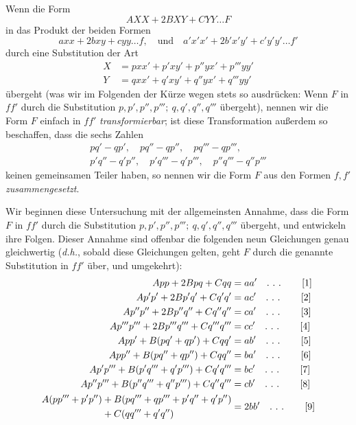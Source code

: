 Wenn die Form
\[
AXX+2BXY+CYY\ldots F
\]
in das Produkt der beiden Formen
\[
axx+2bxy+cyy\ldots f,\quad\text{und}\quad a'x'x'+2b'x'y'+c'y'y'\ldots f'
\]
durch eine Substitution der Art
\[
\begin{aligned}
X&=pxx'+p'xy'+p''yx'+p'''yy'\\
Y&=qxx'+q'xy'+q''yx'+q'''yy'
\end{aligned}
\]
übergeht (was wir im Folgenden der Kürze wegen stets so ausdrücken: Wenn $F$ in $ff'$ durch die Substitution $p,p',p'',p''';\ q,q',q'',q'''$ übergeht), nennen wir die Form $F$ einfach in $ff'$ \textit{transformierbar}; ist diese Transformation außerdem so beschaffen, dass die sechs Zahlen
\[
\begin{gathered}pq'-qp',\quad pq''-qp'',\quad pq'''-qp''',\\p'q''-q'p'',\quad p'q'''-q'p''',\quad p''q'''-q''p'''\end{gathered}
\]
keinen gemeinsamen Teiler haben, so nennen wir die Form $F$ aus den Formen $f,f'$ \textit{zusammengesetzt}.

Wir beginnen diese Untersuchung mit der allgemeinsten Annahme, dass die Form $F$ in $ff'$ durch die Substitution $p,p',p'',p''';\ q,q',q'',q'''$ übergeht, und entwickeln ihre Folgen. Dieser Annahme sind offenbar die folgenden neun Gleichungen genau gleichwertig (\textit{d.h.}, sobald diese Gleichungen gelten, geht $F$ durch die genannte Substitution in $ff'$ über, und umgekehrt):
\begin{align*}
App+2Bpq+Cqq&=aa'\quad\ldotp\,\ldotp\,\ldotp\tag*{[1]}\\
Ap'p'+2Bp'q'+Cq'q'&=ac'\quad\ldotp\,\ldotp\,\ldotp\tag*{[2]}\\
Ap''p''+2Bp''q''+Cq''q''&=ca'\quad\ldotp\,\ldotp\,\ldotp\tag*{[3]}\\
Ap'''p'''+2Bp'''q'''+Cq'''q'''&=cc'\quad\ldotp\,\ldotp\,\ldotp\tag*{[4]}\\
App'+B(pq'+qp')+Cqq'&=ab'\quad\ldotp\,\ldotp\,\ldotp\tag*{[5]}\\
App''+B(pq''+qp'')+Cqq''&=ba'\quad\ldotp\,\ldotp\,\ldotp\tag*{[6]}\\
Ap'p'''+B(p'q'''+q'p''')+Cq'q'''&=bc'\quad\ldotp\,\ldotp\,\ldotp\tag*{[7]}\\
Ap''p'''+B(p''q'''+q''p''')+Cq''q'''&=cb'\quad\ldotp\,\ldotp\,\ldotp\tag*{[8]}\\
\begin{aligned}A(pp'''+p'p'')&+B(pq'''+qp'''+p'q''+q'p'')\\&+C(qq'''+q'q'')\end{aligned}&=2bb'\quad\ldotp\,\ldotp\,\ldotp\tag*{[9]}
\end{align*}

